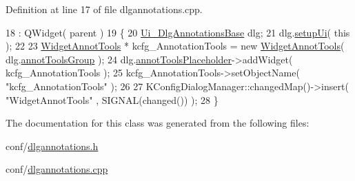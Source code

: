 Definition at line 17 of file dlgannotations.\+cpp.


\begin{DoxyCode}
18     : QWidget( parent )
19 \{
20     \hyperlink{classUi__DlgAnnotationsBase}{Ui\_DlgAnnotationsBase} dlg;
21     dlg.\hyperlink{classUi__DlgAnnotationsBase_a078236dd18dd8f77ded02753ee3c2b7f}{setupUi}( \textcolor{keyword}{this} );
22 
23     \hyperlink{classWidgetAnnotTools}{WidgetAnnotTools} * kcfg\_AnnotationTools = \textcolor{keyword}{new} 
      \hyperlink{classWidgetAnnotTools}{WidgetAnnotTools}( dlg.\hyperlink{classUi__DlgAnnotationsBase_aef6cc8b1de7c7dbf6d4100f2f371bb77}{annotToolsGroup} );
24     dlg.\hyperlink{classUi__DlgAnnotationsBase_a87373fcbb302ebee34dce288e76b7bec}{annotToolsPlaceholder}->addWidget( kcfg\_AnnotationTools );
25     kcfg\_AnnotationTools->setObjectName( \textcolor{stringliteral}{"kcfg\_AnnotationTools"} );
26 
27     KConfigDialogManager::changedMap()->insert( \textcolor{stringliteral}{"WidgetAnnotTools"} , SIGNAL(changed()) );
28 \}
\end{DoxyCode}


The documentation for this class was generated from the following files\+:\begin{DoxyCompactItemize}
\item 
conf/\hyperlink{dlgannotations_8h}{dlgannotations.\+h}\item 
conf/\hyperlink{dlgannotations_8cpp}{dlgannotations.\+cpp}\end{DoxyCompactItemize}
